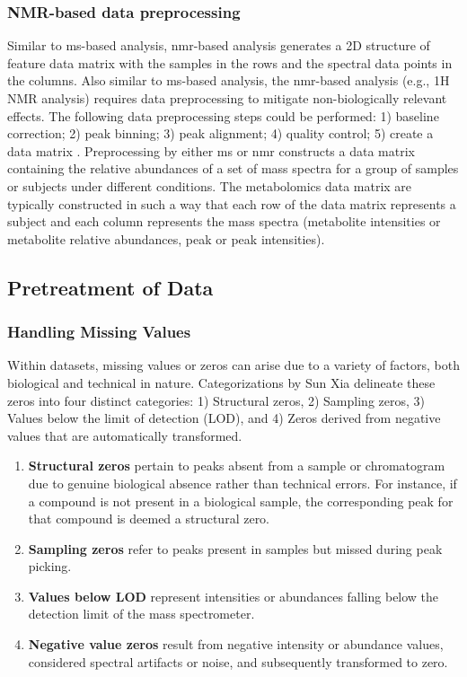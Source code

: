 \documentclass[ENG, BIB]{TFUOC}%
\begin{document}
\subsubsection{NMR-based data preprocessing}
Similar to \acrshort{ms}-based analysis, \acrshort{nmr}-based analysis generates a 2D structure of feature data matrix with the samples in the rows and the spectral data points in the columns. Also similar to \acrshort{ms}-based analysis, the \acrshort{nmr}-based analysis (e.g., 1H NMR analysis) requires data preprocessing to mitigate non-biologically relevant effects. The following data preprocessing steps could be performed: 1) baseline correction; 2) peak binning; 3) peak alignment; 4) quality control; 5) create a data matrix \cite{sunPretreatingNormalizingMetabolomics2024,martinPepsNMR1HNMR2018,trygg01BackgroundEstimation2009,alonsoAnalyticalMethodsUntargeted2015,bloembergWarpingMethodsSpectroscopic2013,borkChromatographicPeakAlignment2013,veselkovRecursiveSegmentwisePeak2009,sawallMultiobjectiveOptimizationAutomated2018}.
Preprocessing by either \acrshort{ms} or \acrshort{nmr} constructs a data matrix containing the relative abundances of a set of mass spectra for a group of samples or subjects under different conditions. The metabolomics data matrix are typically constructed in such a way that each row of the data matrix represents a subject and each column represents the mass spectra (metabolite intensities or metabolite relative abundances, peak or peak intensities).


\subsection{Pretreatment of Data}
\subsubsection{Handling Missing Values}
Within datasets, missing values or zeros can arise due to a variety of factors, both biological and technical in nature. Categorizations by Sun Xia delineate these zeros into four distinct categories: 1) Structural zeros, 2) Sampling zeros, 3) Values below the limit of detection (LOD), and 4) Zeros derived from negative values that are automatically transformed.
\begin{enumerate}
    \item \textbf{Structural zeros} pertain to peaks absent from a sample or chromatogram due to genuine biological absence rather than technical errors. For instance, if a compound is not present in a biological sample, the corresponding peak for that compound is deemed a structural zero.
    \item \textbf{Sampling zeros} refer to peaks present in samples but missed during peak picking.
    \item \textbf{Values below LOD} represent intensities or abundances falling below the detection limit of the mass spectrometer.
    \item \textbf{Negative value zeros} result from negative intensity or abundance values,
    considered spectral artifacts or noise, and subsequently transformed to zero.
\end{enumerate}
\end{document}
